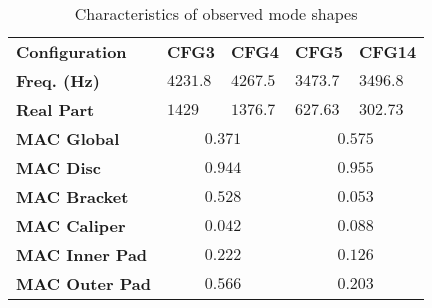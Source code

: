 \documentclass[final,1p]{elsarticle}
\begin{document}
\begin{table}[h!]
\centering
\caption{Characteristics of observed mode shapes}
\begin{tabularx}{\hsize}{lYYYY}
\toprule
\textbf{Configuration}   	 				& \textbf{CFG3} 	& \textbf{CFG4}  	& \textbf{CFG5} 		& \textbf{CFG14}  \\
\cmidrule(lr){2-3}\cmidrule(lr){4-5}
\textbf{Freq. (Hz)}                  			& $4231.8$ 		& $4267.5$ 	 		&  $3473.7$      		& $3496.8$  		\\
\textbf{Real Part}                   			& $1429$			& $1376.7$       		& $627.63 $      		& $302.73$		 \\
\textbf{MAC Global}  						&     		&    		\\
\textbf{MAC Disc}  							&    		&    		 \\
\textbf{MAC Bracket}  					&    		&    	 	\\
\textbf{MAC Caliper}  						&    		&    	 	\\
\textbf{MAC Inner Pad}  					&    		&    	 	\\
\textbf{MAC Outer Pad}  				&    		&    		\\
\bottomrule
\end{tabularx}
\label{tab:ModesComparesCarac}
\end{table}
\end{document}
